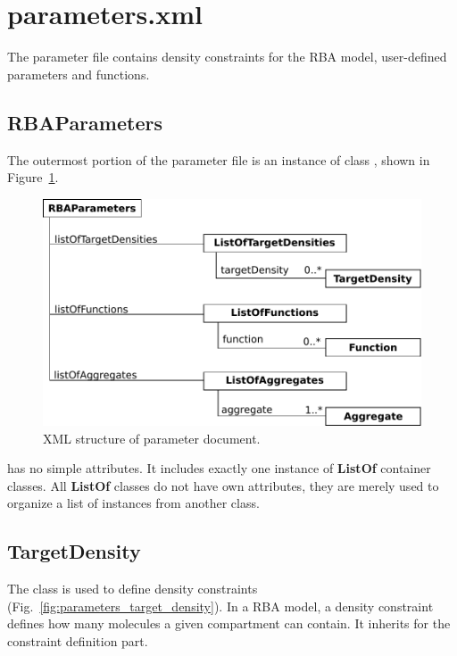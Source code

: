 
\section{parameters.xml}

The parameter file contains density constraints for the RBA model,
user-defined parameters and functions.


\subsection{RBAParameters}
\label{sec:rba_parameters}

The outermost portion of the parameter file is an instance of class
\rbaparameters, shown in Figure~\ref{fig:parameters_doc}.

\begin{figure}
  \centering
  \includegraphics[scale=0.9]{figures/parameters_doc}
  \caption{XML structure of parameter document.}
\label{fig:parameters_doc}
\end{figure}

\rbaparameters{} has no simple attributes.
It includes exactly one instance of \textbf{ListOf} container classes.
All \textbf{ListOf} classes do not have own attributes,
they are merely used to organize a list of instances from another class.


\subsection{TargetDensity}
\label{sec:target_density}

The \targetdensity{} class is used to define density constraints
(Fig.~\ref{fig:parameters_target_density}).
In a RBA model, a density constraint defines how many molecules
a given compartment can contain.
It inherits \targetvalue{} for the constraint definition part.

